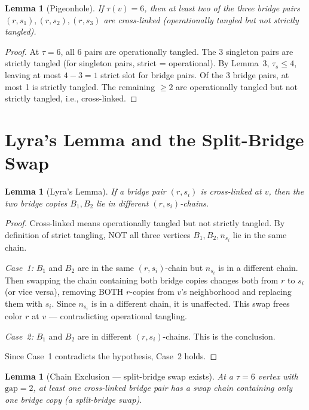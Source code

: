 \documentclass[11pt]{article}
\newtheorem{lemma}[theorem]{Lemma}
\theoremstyle{remark}
\begin{document}
\begin{lemma}[Pigeonhole]
If $\tau(v) = 6$, then at least two of the three bridge pairs $(r, s_1), (r, s_2), (r, s_3)$ are cross-linked (operationally tangled but not strictly tangled).
\end{lemma}

\begin{proof}
At $\tau = 6$, all 6 pairs are operationally tangled. The 3 singleton pairs are strictly tangled (for singleton pairs, strict = operational). By Lemma~3, $\tau_s \leq 4$, leaving at most $4 - 3 = 1$ strict slot for bridge pairs. Of the 3 bridge pairs, at most 1 is strictly tangled. The remaining $\geq 2$ are operationally tangled but not strictly tangled, i.e., cross-linked.
\end{proof}

\section{Lyra's Lemma and the Split-Bridge Swap}

\begin{lemma}[Lyra's Lemma]
If a bridge pair $(r, s_i)$ is cross-linked at $v$, then the two bridge copies $B_1, B_2$ lie in different $(r, s_i)$-chains.
\end{lemma}

\begin{proof}
Cross-linked means operationally tangled but not strictly tangled. By definition of strict tangling, NOT all three vertices $B_1, B_2, n_{s_i}$ lie in the same chain.

\emph{Case~1:} $B_1$ and $B_2$ are in the same $(r, s_i)$-chain but $n_{s_i}$ is in a different chain. Then swapping the chain containing both bridge copies changes both from $r$ to $s_i$ (or vice versa), removing BOTH $r$-copies from $v$'s neighborhood and replacing them with $s_i$. Since $n_{s_i}$ is in a different chain, it is unaffected. This swap frees color $r$ at $v$ --- contradicting operational tangling.

\emph{Case~2:} $B_1$ and $B_2$ are in different $(r, s_i)$-chains. This is the conclusion.

Since Case~1 contradicts the hypothesis, Case~2 holds.
\end{proof}

\begin{lemma}[Chain Exclusion --- split-bridge swap exists]
At a $\tau = 6$ vertex with $\mathrm{gap} = 2$, at least one cross-linked bridge pair has a swap chain containing only one bridge copy (a \emph{split-bridge swap}).
\end{lemma}
\end{document}
